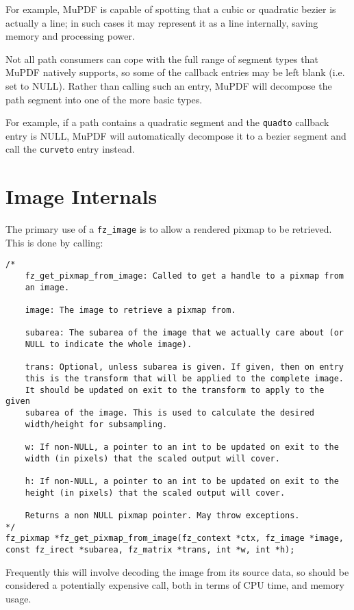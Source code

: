 \documentclass[oneside]{book}
\begin{document}
For example, MuPDF is capable of spotting that a cubic or quadratic bezier is actually a line; in such cases it may represent it as a line internally, saving memory and processing power.

Not all path consumers can cope with the full range of segment types that MuPDF natively supports, so some of the callback entries may be left blank (i.e. set to NULL). Rather than calling such an entry, MuPDF will decompose the path segment into one of the more basic types.

For example, if a path contains a quadratic segment and the \texttt{quadto} callback entry is NULL, MuPDF will automatically decompose it to a bezier segment and call the \texttt{curveto} entry instead.

\chapter{Image Internals}
\label{Images}

The primary use of a \texttt{fz\_image} is to allow a rendered pixmap to be retrieved. This is done by calling:

\begin{lstlisting}
/*
	fz_get_pixmap_from_image: Called to get a handle to a pixmap from
	an image.

	image: The image to retrieve a pixmap from.

	subarea: The subarea of the image that we actually care about (or
	NULL to indicate the whole image).

	trans: Optional, unless subarea is given. If given, then on entry
	this is the transform that will be applied to the complete image.
	It should be updated on exit to the transform to apply to the given
	subarea of the image. This is used to calculate the desired
	width/height for subsampling.

	w: If non-NULL, a pointer to an int to be updated on exit to the
	width (in pixels) that the scaled output will cover.

	h: If non-NULL, a pointer to an int to be updated on exit to the
	height (in pixels) that the scaled output will cover.

	Returns a non NULL pixmap pointer. May throw exceptions.
*/
fz_pixmap *fz_get_pixmap_from_image(fz_context *ctx, fz_image *image, const fz_irect *subarea, fz_matrix *trans, int *w, int *h);
\end{lstlisting}

Frequently this will involve decoding the image from its source data, so should be considered a potentially expensive call, both in terms of CPU time, and memory usage.
\end{document}
